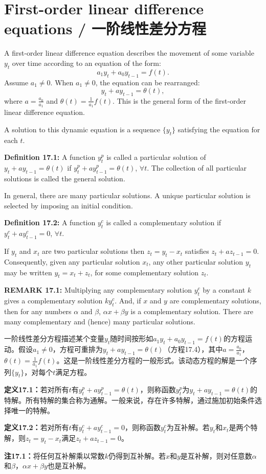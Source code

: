 \section{First-order linear difference equations / 一阶线性差分方程}

\begin{original}
A first-order linear difference equation describes the movement of some variable $y_t$ over time according to an equation of the form:
\[
a_1 y_t + a_0 y_{t-1} = f(t).
\]
Assume $a_1 \neq 0$. When $a_1 \neq 0$, the equation can be rearranged:
\[
y_t + a y_{t-1} = \theta(t), \tag{17.4}
\]
where $a = \frac{a_0}{a_1}$ and $\theta(t) = \frac{1}{a_1} f(t)$. This is the general form of the first-order linear difference equation.

A solution to this dynamic equation is a sequence $\{y_t\}$ satisfying the equation for each $t$.

\textbf{Definition 17.1:} A function $y_t^p$ is called a particular solution of $y_t + a y_{t-1} = \theta(t)$ if $y_t^p + a y_{t-1}^p = \theta(t)$, $\forall t$. The collection of all particular solutions is called the general solution.

In general, there are many particular solutions. A unique particular solution is selected by imposing an initial condition.

\textbf{Definition 17.2:} A function $y_t^c$ is called a complementary solution if $y_t^c + a y_{t-1}^c = 0$, $\forall t$.

If $y_t$ and $x_t$ are two particular solutions then $z_t = y_t - x_t$ satisfies $z_t + a z_{t-1} = 0$. Consequently, given any particular solution $x_t$, any other particular solution $y_t$ may be written $y_t = x_t + z_t$, for some complementary solution $z_t$.

\textbf{REMARK 17.1:} Multiplying any complementary solution $y_t^c$ by a constant $k$ gives a complementary solution $k y_t^c$. And, if $x$ and $y$ are complementary solutions, then for any numbers $\alpha$ and $\beta$, $\alpha x + \beta y$ is a complementary solution. There are many complementary and (hence) many particular solutions.
\end{original}
\begin{translation}
一阶线性差分方程描述某个变量$y_t$随时间按形如$a_1 y_t + a_0 y_{t-1} = f(t)$的方程运动。假设$a_1 \neq 0$，方程可重排为$y_t + a y_{t-1} = \theta(t)$（方程17.4），其中$a = \frac{a_0}{a_1}$，$\theta(t) = \frac{1}{a_1} f(t)$。这是一阶线性差分方程的一般形式。该动态方程的解是一个序列$\{y_t\}$，对每个$t$满足方程。

\textbf{定义17.1：}若对所有$t$有$y_t^p + a y_{t-1}^p = \theta(t)$，则称函数$y_t^p$为$y_t + a y_{t-1} = \theta(t)$的特解。所有特解的集合称为通解。一般来说，存在许多特解，通过施加初始条件选择唯一的特解。

\textbf{定义17.2：}若对所有$t$有$y_t^c + a y_{t-1}^c = 0$，则称函数$y_t^c$为互补解。若$y_t$和$x_t$是两个特解，则$z_t = y_t - x_t$满足$z_t + a z_{t-1} = 0$。

\textbf{注17.1：}将任何互补解乘以常数$k$仍得到互补解。若$x$和$y$是互补解，则对任意数$\alpha$和$\beta$，$\alpha x + \beta y$也是互补解。
\end{translation}

